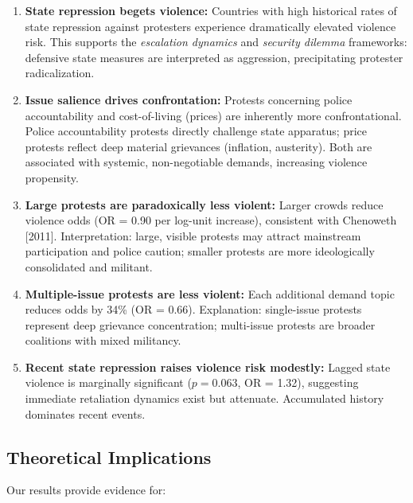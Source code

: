 \documentclass[11pt,a4paper]{article}
\begin{document}
\begin{enumerate}
    \item \textbf{State repression begets violence:} Countries with high historical rates of state repression against protesters experience dramatically elevated violence risk. This supports the \emph{escalation dynamics} and \emph{security dilemma} frameworks: defensive state measures are interpreted as aggression, precipitating protester radicalization.
    
    \item \textbf{Issue salience drives confrontation:} Protests concerning police accountability and cost-of-living (prices) are inherently more confrontational. Police accountability protests directly challenge state apparatus; price protests reflect deep material grievances (inflation, austerity). Both are associated with systemic, non-negotiable demands, increasing violence propensity.
    
    \item \textbf{Large protests are paradoxically less violent:} Larger crowds reduce violence odds (OR = 0.90 per log-unit increase), consistent with Chenoweth [2011]. Interpretation: large, visible protests may attract mainstream participation and police caution; smaller protests are more ideologically consolidated and militant.
    
    \item \textbf{Multiple-issue protests are less violent:} Each additional demand topic reduces odds by 34\% (OR = 0.66). Explanation: single-issue protests represent deep grievance concentration; multi-issue protests are broader coalitions with mixed militancy.
    
    \item \textbf{Recent state repression raises violence risk modestly:} Lagged state violence is marginally significant ($p = 0.063$, OR = 1.32), suggesting immediate retaliation dynamics exist but attenuate. Accumulated history dominates recent events.
\end{enumerate}

\subsection{Theoretical Implications}

Our results provide evidence for:
\end{document}
